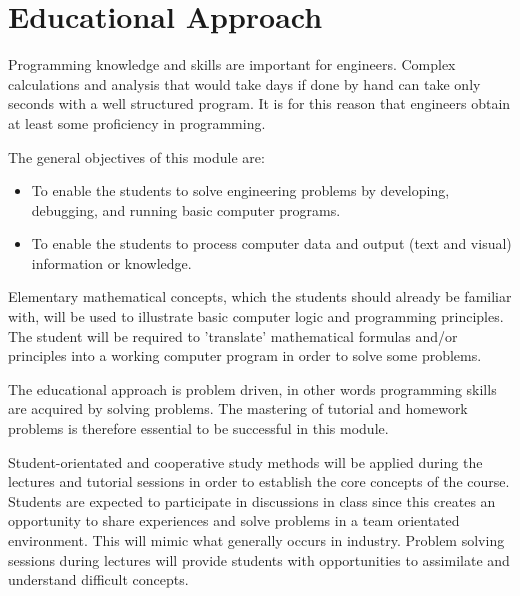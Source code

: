 \section{Educational Approach}
    Programming knowledge and skills are important for engineers. Complex
    calculations and analysis that would take days if done by hand can take
    only seconds with a well structured program. It is for this reason that
    engineers obtain at least some proficiency in programming.

    The general objectives of this module are:
    \begin{itemize}
        \item To enable the students to solve engineering problems by
            developing, debugging, and running basic computer programs.
        \item To enable the students to process computer data and output
            (text and visual) information or knowledge.
    \end{itemize}

    Elementary mathematical concepts, which the students should
    already be familiar with, will be used to illustrate basic
    computer logic and programming principles. The student will be
    required to 'translate' mathematical formulas and/or principles
    into a working computer program in order to solve some problems.

    The educational approach is problem driven, in other words
    programming skills are acquired by solving problems. The mastering
    of tutorial and homework problems is therefore essential to be successful
    in this module.

    Student-orientated and cooperative study methods will be applied during
    the lectures and tutorial sessions in order to establish the core concepts
    of the course. Students are expected to participate in discussions in
    class since this creates an opportunity to share experiences and solve
    problems in a team orientated environment. This will mimic what generally
    occurs in industry. Problem solving sessions during lectures will provide
    students with opportunities to assimilate and understand difficult concepts.

